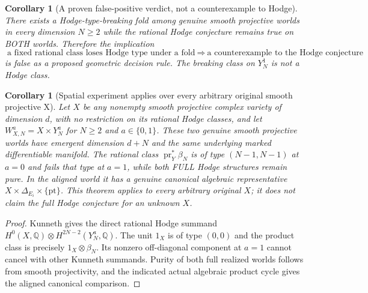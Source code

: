\documentclass[11pt]{article}
\newtheorem{corollary}[theorem]{Corollary}
\begin{document}
\begin{corollary}[A proven false-positive verdict, not a counterexample to Hodge]
There exists a Hodge-type-breaking fold among genuine smooth
projective worlds in every dimension $N\ge2$ while the
rational Hodge conjecture remains true on BOTH worlds.
Therefore the implication
\[
 \boxed{\text{a fixed rational class loses Hodge type under a fold}
 \ \Longrightarrow\ \text{a counterexample to the Hodge conjecture}}
 \tag{5}
\]
is false as a proposed geometric decision rule.
The breaking class on $Y_N^1$ is not a Hodge class.
\end{corollary}


\begin{corollary}[Spatial experiment applies over every arbitrary original smooth projective X]
Let $X$ be any nonempty smooth projective complex variety of dimension $d$,
with no restriction on its rational Hodge classes, and let
$W_{X,N}^a=X\times Y_N^a$ for $N\ge2$ and $a\in\{0,1\}$.
These two genuine smooth projective worlds have
\emph{emergent dimension} $d+N$ and the same
underlying marked differentiable manifold. The
rational class $\operatorname{pr}_{Y}^*\beta_N$ is of
type $(N-1,N-1)$ at $a=0$ and fails that type at
$a=1$, while both FULL Hodge structures remain
pure. In the aligned world it has a genuine
canonical algebraic representative
$X\times\Delta_{E_i}\times\{\mathrm{pt}\}$.
This theorem applies to every arbitrary original $X$;
it does not claim the full Hodge conjecture for an
unknown $X$.
\end{corollary}
\begin{proof}
Kunneth gives the direct rational Hodge summand
$H^0(X,\mathbb Q)\otimes H^{2N-2}(Y_N^a,\mathbb Q)$.
The unit $1_X$ is of type $(0,0)$ and the
product class is precisely $1_X\otimes\beta_N$.
Its nonzero off-diagonal component at $a=1$
cannot cancel with other Kunneth summands.
Purity of both full realized worlds follows
from smooth projectivity, and the indicated
actual algebraic product cycle gives the aligned
canonical comparison.
\end{proof}
\end{document}
